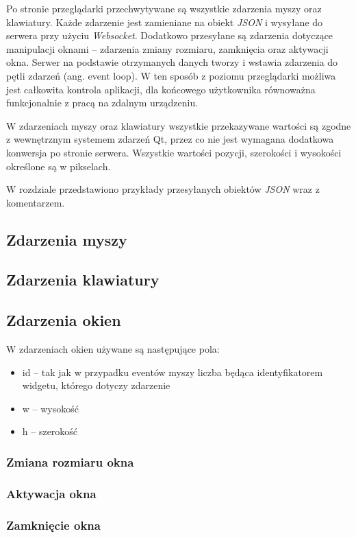 Po stronie przeglądarki przechwytywane są wszystkie zdarzenia myszy oraz klawiatury. Każde zdarzenie jest zamieniane na obiekt \emph{JSON} i wysyłane do serwera przy użyciu \emph{Websocket}. Dodatkowo przesyłane są zdarzenia dotyczące manipulacji oknami -- zdarzenia zmiany rozmiaru, zamknięcia oraz aktywacji okna. Serwer na podstawie otrzymanych danych tworzy i wstawia zdarzenia do pętli zdarzeń (ang. event loop). W ten sposób z poziomu przeglądarki możliwa jest całkowita kontrola aplikacji, dla końcowego użytkownika równoważna funkcjonalnie z pracą na zdalnym urządzeniu.

W zdarzeniach myszy oraz klawiatury wszystkie przekazywane wartości są zgodne z wewnętrznym systemem zdarzeń Qt, przez co nie jest wymagana dodatkowa konwersja po stronie serwera. Wszystkie wartości pozycji, szerokości i wysokości określone są w pikselach.

W rozdziale przedstawiono przykłady przesyłanych obiektów \emph{JSON} wraz z komentarzem.

\subsection{Zdarzenia myszy}



\subsection{Zdarzenia klawiatury}


\subsection{Zdarzenia okien}

W zdarzeniach okien używane są następujące pola:
\begin{itemize}
\item id -- tak jak w przypadku eventów myszy liczba będąca identyfikatorem widgetu, którego dotyczy zdarzenie
\item w -- wysokość
\item h -- szerokość
\end{itemize}

\subsubsection{Zmiana rozmiaru okna}


\subsubsection{Aktywacja okna}


\subsubsection{Zamknięcie okna}

